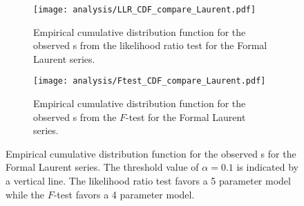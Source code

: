 \begin{figure}[htbp]
 \centering
 \begin{subfigure}[t]{0.48\textwidth}
  \centering
  \texttt{[image: analysis/LLR\_CDF\_compare\_Laurent.pdf]}
  \caption[Empirical cumulative distribution function for the observed \pvalue{}s from the likelihood ratio test for the Formal Laurent series.]{%
   Empirical cumulative distribution function for the observed \pvalue{}s from the likelihood ratio test for the Formal Laurent series.}
  \label{fig:LLR_CDF_compare_Laurent}
 \end{subfigure}%
 \quad
 \begin{subfigure}[t]{0.48\textwidth}
  \centering
  \texttt{[image: analysis/Ftest\_CDF\_compare\_Laurent.pdf]}
  \caption[Empirical cumulative distribution function for the observed \pvalue{}s from the $F$-test for the Formal Laurent series.]{%
   Empirical cumulative distribution function for the observed \pvalue{}s from the $F$-test for the Formal Laurent series.}
  \label{fig:Ftest_CDF_compare_Laurent}
 \end{subfigure}%
 \caption[Empirical cumulative distribution function for the observed \pvalue{}s for the Formal Laurent series.]{%
  Empirical cumulative distribution function for the observed \pvalue{}s for the Formal Laurent series.
  The threshold value of $\alpha=0.1$ is indicated by a vertical line.
  The likelihood ratio test favors a 5 parameter model while the $F$-test favors a 4 parameter model.}
 \label{fig:empirical_CDF_laurent}
\end{figure}

